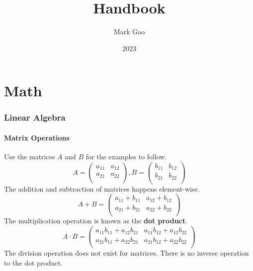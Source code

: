 \documentclass[10pt,a4paper,fleqn]{article} %
\begin{document}

\title{Handbook}
\author{Mark Gao}
\date{2023}
\maketitle

\newpage

\tableofcontents

\newpage


\part{Math}

\section{Linear Algebra} %

\subsection{Matrix Operations} %
Use the matrices $A$ and $B$ for the examples to follow.
\begin{equation*}
    A = \begin{pmatrix}
        a_{11} & a_{12} \\
        a_{21} & a_{22} \\
    \end{pmatrix},
    B = \begin{pmatrix}
        b_{11} & b_{12} \\
        b_{21} & b_{22} \\
    \end{pmatrix}
\end{equation*}
The addition and subtraction of matrices happens element-wise.
\begin{equation}
    A + B = 
    \begin{pmatrix}
        a_{11} + b_{11} & a_{12} + b_{12} \\
        a_{21} + b_{21} & a_{22} + b_{22} \\
    \end{pmatrix}
\end{equation}
The multiplication operation is known as the \textbf{dot product}.
\begin{equation}
    A \cdot B = 
    \begin{pmatrix}
        a_{11} b_{11} + a_{12} b_{21} & a_{11} b_{12} + a_{12} b_{22} \\
        a_{21} b_{11} + a_{22} b_{21} & a_{21} b_{12} + a_{22} b_{22} \\
    \end{pmatrix}
\end{equation}
The division operation does not exist for matrices. There is no inverse operation to
the dot product.
\newline
\end{document}
